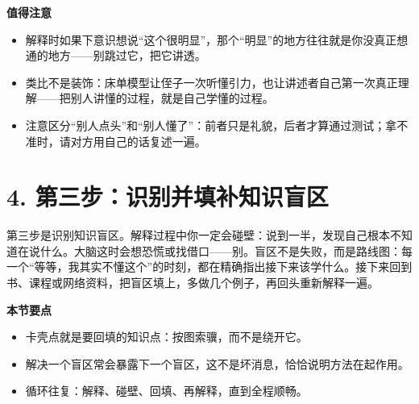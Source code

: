 \documentclass[UTF8,a4paper,11pt]{ctexart}
\begin{document}
\begin{center}
\end{center}

\begin{keyconcept}
\textbf{值得注意}
\begin{itemize}
  \item 解释时如果下意识想说“这个很明显”，那个“明显”的地方往往就是你没真正想通的地方——别跳过它，把它讲透。
  \item 类比不是装饰：床单模型让侄子一次听懂引力，也让讲述者自己第一次真正理解——把别人讲懂的过程，就是自己学懂的过程。
  \item 注意区分“别人点头”和“别人懂了”：前者只是礼貌，后者才算通过测试；拿不准时，请对方用自己的话复述一遍。
\end{itemize}
\end{keyconcept}


\section*{4. 第三步：识别并填补知识盲区}

第三步是识别知识盲区。解释过程中你一定会碰壁：说到一半，发现自己根本不知道在说什么。大脑这时会想恐慌或找借口——别。盲区不是失败，而是路线图：每一个“等等，我其实不懂这个”的时刻，都在精确指出接下来该学什么。接下来回到书、课程或网络资料，把盲区填上，多做几个例子，再回头重新解释一遍。

\begin{keyconcept}
\textbf{本节要点}
\begin{itemize}
  \item 卡壳点就是要回填的知识点：按图索骥，而不是绕开它。
  \item 解决一个盲区常会暴露下一个盲区，这不是坏消息，恰恰说明方法在起作用。
  \item 循环往复：解释、碰壁、回填、再解释，直到全程顺畅。
\end{itemize}
\end{keyconcept}

\begin{center}
\end{center}
\end{document}
